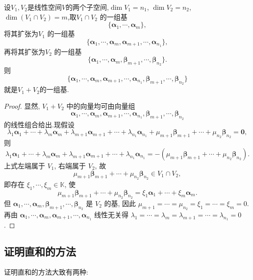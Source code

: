 \documentclass[../../main.tex]{subfiles}
\begin{document}
\begin{corollary}\label{corollary:空间分解关于基的结论}
设\(V_1,V_2\)是线性空间\(V\)的两个子空间,$\dim V_1 = n_1$, $\dim V_2 = n_2$, $\dim(V_1 \cap V_2) = m$,取$V_1 \cap V_2$ 的一组基$$\{\boldsymbol{\alpha}_1, \cdots, \boldsymbol{\alpha}_m\},$$将其扩张为$V_1$ 的一组基$$\{\boldsymbol{\alpha}_1, \cdots, \boldsymbol{\alpha}_m, \boldsymbol{\alpha}_{m + 1}, \cdots, \boldsymbol{\alpha}_{n_1}\},$$
再将其扩张为$V_2$ 的一组基$$\{\boldsymbol{\alpha}_1, \cdots, \boldsymbol{\alpha}_m, \boldsymbol{\beta}_{m + 1}, \cdots, \boldsymbol{\beta}_{n_2}\}.$$
则
$$
\{\boldsymbol{\alpha}_1, \cdots, \boldsymbol{\alpha}_m, \boldsymbol{\alpha}_{m + 1}, \cdots, \boldsymbol{\alpha}_{n_1}, \boldsymbol{\beta}_{m + 1}, \cdots, \boldsymbol{\beta}_{n_2}\}
$$
就是$V_1+V_2$的一组基.
\end{corollary}
\begin{proof}
显然, $V_1 + V_2$ 中的向量均可由向量组
$$
\boldsymbol{\alpha}_1, \cdots, \boldsymbol{\alpha}_m, \boldsymbol{\alpha}_{m + 1}, \cdots, \boldsymbol{\alpha}_{n_1}, \boldsymbol{\beta}_{m + 1}, \cdots, \boldsymbol{\beta}_{n_2}
$$
的线性组合给出.现假设
$$
\lambda_1\boldsymbol{\alpha}_1 + \cdots + \lambda_m\boldsymbol{\alpha}_m + \lambda_{m + 1}\boldsymbol{\alpha}_{m + 1} + \cdots + \lambda_{n_1}\boldsymbol{\alpha}_{n_1} + \mu_{m + 1}\boldsymbol{\beta}_{m + 1} + \cdots + \mu_{n_2}\boldsymbol{\beta}_{n_2} = \boldsymbol{0},
$$
则
$$
\lambda_1\boldsymbol{\alpha}_1 + \cdots + \lambda_m\boldsymbol{\alpha}_m + \lambda_{m + 1}\boldsymbol{\alpha}_{m + 1} + \cdots + \lambda_{n_1}\boldsymbol{\alpha}_{n_1} = -(\mu_{m + 1}\boldsymbol{\beta}_{m + 1} + \cdots + \mu_{n_2}\boldsymbol{\beta}_{n_2}).
$$
上式左端属于 $V_1$, 右端属于 $V_2$, 故
$$
\mu_{m + 1}\boldsymbol{\beta}_{m + 1} + \cdots + \mu_{n_2}\boldsymbol{\beta}_{n_2} \in V_1 \cap V_2,
$$
即存在 $\xi_1, \cdots, \xi_m \in \mathbb{K}$, 使
$$
\mu_{m + 1}\boldsymbol{\beta}_{m + 1} + \cdots + \mu_{n_2}\boldsymbol{\beta}_{n_2} = \xi_1\boldsymbol{\alpha}_1 + \cdots + \xi_m\boldsymbol{\alpha}_m.
$$
但 $\boldsymbol{\alpha}_1, \cdots, \boldsymbol{\alpha}_m, \boldsymbol{\beta}_{m + 1}, \cdots, \boldsymbol{\beta}_{n_2}$ 是 $V_2$ 的基, 因此 $\mu_{m + 1} = \cdots = \mu_{n_2} = \xi_1 = \cdots = \xi_m = 0$. 再由 $\boldsymbol{\alpha}_1, \cdots, \boldsymbol{\alpha}_m, \boldsymbol{\alpha}_{m + 1}, \cdots, \boldsymbol{\alpha}_{n_1}$ 线性无关得 $\lambda_1 = \cdots = \lambda_m = \lambda_{m + 1} = \cdots = \lambda_{n_1} = 0$. 
\end{proof}

\subsection{证明直和的方法}
证明直和的方法大致有两种:
\end{document}

